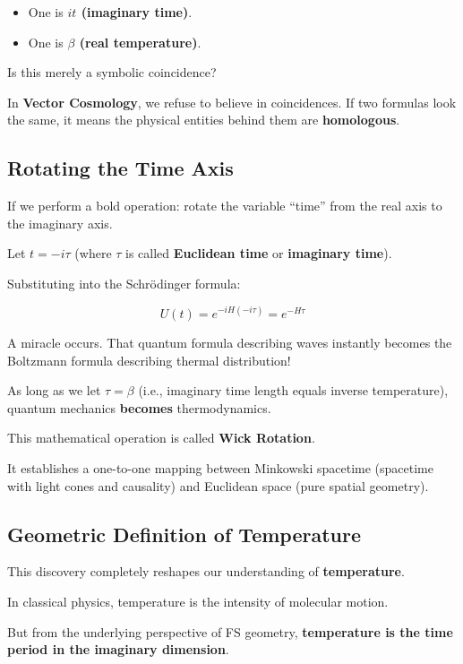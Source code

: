 \begin{itemize}
\item One is \textbf{$it$ (imaginary time)}.

\item One is \textbf{$\beta$ (real temperature)}.
\end{itemize}

Is this merely a symbolic coincidence?

In \textbf{Vector Cosmology}, we refuse to believe in coincidences. If two formulas look the same, it means the physical entities behind them are \textbf{homologous}.

\subsection{Rotating the Time Axis}

If we perform a bold operation: rotate the variable ``time'' from the real axis to the imaginary axis.

Let $t = -i \tau$ (where $\tau$ is called \textbf{Euclidean time} or \textbf{imaginary time}).

Substituting into the Schrödinger formula:

$$U(t) = e^{-i H (-i \tau)} = e^{-H \tau}$$

A miracle occurs. That quantum formula describing waves instantly becomes the Boltzmann formula describing thermal distribution!

As long as we let $\tau = \beta$ (i.e., imaginary time length equals inverse temperature), quantum mechanics \textbf{becomes} thermodynamics.

This mathematical operation is called \textbf{Wick Rotation}.

It establishes a one-to-one mapping between Minkowski spacetime (spacetime with light cones and causality) and Euclidean space (pure spatial geometry).

\subsection{Geometric Definition of Temperature}

This discovery completely reshapes our understanding of \textbf{temperature}.

In classical physics, temperature is the intensity of molecular motion.

But from the underlying perspective of FS geometry, \textbf{temperature is the time period in the imaginary dimension}.

